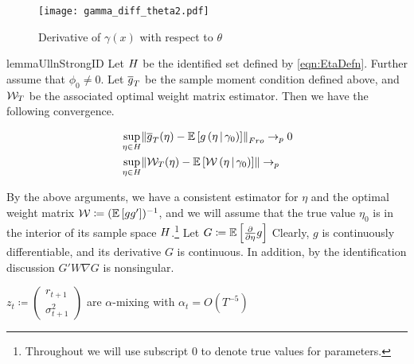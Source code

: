 \documentclass[11pt, letterpaper, twoside, final]{article}
\begin{document}
\begin{figure}[htb]
    \centering
    \caption{Derivative of $\gamma(x)$ with respect to $\theta$}
    \label{fig:fig:gamma_diff_theta2}
    \texttt{[image: gamma\_diff\_theta2.pdf]}
\end{figure}

\begin{restatable}{lemma}{UllnStrongID}
    \label{lemma:UniformConvergenceStrongID}
    Let $H$ be the identified set defined by \cref{eqn:EtaDefn}.
    Further assume that $\phi_0 \neq 0$. 
    Let $\overline{g}_T$ be the sample moment condition defined above, and $\mathcal{W}_T$ be the associated optimal weight matrix
    estimator.
    Then we have the following convergence.

    \begin{align}
        &\sup_{\eta \in \Eta} \norm*{\sampmom(\eta) - \E\left[g\left(\eta \mvert \gamma_0\right)\right]}_{Fro}
          \pto 0 \\ 
        &\sup_{\eta \in \Eta} \norm{\W_{T}(\eta)-\E\left[\W\left(\eta \mvert \gamma_0\right)\right]} \pto 
    \end{align}

\end{restatable}



By the above arguments, we have a consistent estimator for $\eta$ and the optimal weight matrix $\mathcal{W} \coloneqq
(\mathbb{E}\left[g g'\right])^{-1}$, and we will assume that the true value $\eta_{0}$ is in the interior of its sample
space $H$.\footnote{Throughout we will use subscript \num{0}  to denote true values for parameters.}
Let $G \coloneqq \mathbb{E}\left[\frac{\partial}{\partial \eta} g \right]$
Clearly, $g$ is continuously differentiable, and its derivative $G$ is continuous.
In addition, by the identification discussion $G' W \nabla G$ is nonsingular.


\begin{assump}
    \label{assumption:weak_dependence}
    $z_t \coloneqq \begin{pmatrix} r_{t+1} \\ \sigma^2_{t+1} \end{pmatrix}$ are $\alpha$-mixing with $\alpha_t =
       O\left(T^{-5}\right)$
\end{assump}
\end{document}
